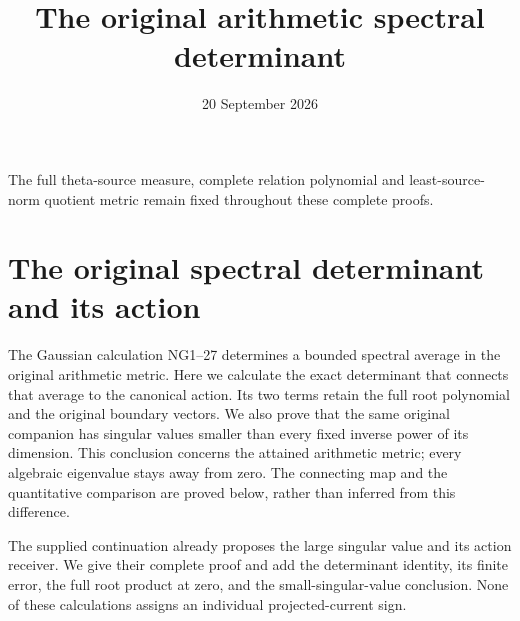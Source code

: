 \documentclass[11pt]{article}
\begin{document}
\title{The original arithmetic spectral determinant}\author{}\date{20 September 2026}\maketitle
The full theta-source measure, complete relation polynomial and least-source-norm
quotient metric remain fixed throughout these complete proofs.


\clearpage\begingroup
\part*{The original spectral determinant and its action}
\newcommand{\osdR}{\mathbb R}\newcommand{\osdC}{\mathbb C}
\newcommand{\osdPP}{\mathcal P}\newcommand{\osddd}{\,d}
\newcommand{\osdnorm}[1]{\left\lVert#1\right\rVert}
\newcommand{\osdTr}{\operatorname{Tr}}\newcommand{\osdrank}{\operatorname{rank}}
\newtheorem{osdtheorem}{Theorem}\newtheorem{osdlemma}[osdtheorem]{Lemma}


The Gaussian calculation NG1--27 \cite{osd:NG} determines a bounded spectral
average in the original arithmetic metric. Here we calculate the exact
determinant that connects that average to the canonical action. Its two
terms retain the full root polynomial and the original boundary vectors.
We also prove that the same original companion has singular values smaller
than every fixed inverse power of its dimension. This conclusion concerns
the attained arithmetic metric; every algebraic eigenvalue stays away
from zero. The connecting map and the quantitative comparison are proved
below, rather than inferred from this difference.

The supplied continuation \cite[Section 5]{osd:incoming} already proposes the
large singular value and its action receiver. We give their complete
proof and add the determinant identity, its finite error, the full root
product at zero, and the small-singular-value conclusion. None of these
calculations assigns an individual projected-current sign.
\end{document}
